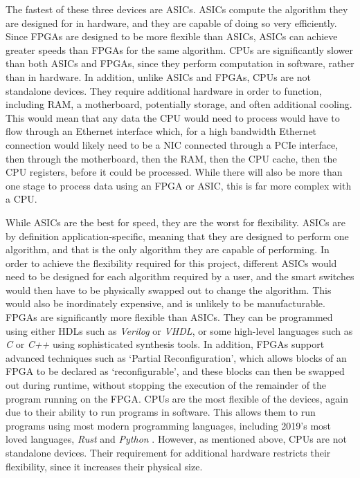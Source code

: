 The fastest of these three devices are ASICs. ASICs compute the algorithm they are designed for in hardware, and they are capable of doing so very efficiently.
Since FPGAs are designed to be more flexible than ASICs, ASICs can achieve greater speeds than FPGAs for the same algorithm.
CPUs are significantly slower than both ASICs and FPGAs, since they perform computation in software, rather than in hardware. In addition, unlike ASICs and FPGAs, CPUs are not standalone devices. They require additional hardware in order to function, including RAM, a motherboard, potentially storage, and often additional cooling. This would mean that any data the CPU would need to process would have to flow through an Ethernet interface which, for a high bandwidth Ethernet connection would likely need to be a NIC connected through a PCIe interface, then through the motherboard, then the RAM, then the CPU cache, then the CPU registers, before it could be processed. While there will also be more than one stage to process data using an FPGA or ASIC, this is far more complex with a CPU.

While ASICs are the best for speed, they are the worst for flexibility. ASICs are by definition application-specific, meaning that they are designed to perform one algorithm, and that is the only algorithm they are capable of performing. In order to achieve the flexibility required for this project, different ASICs would need to be designed for each algorithm required by a user, and the smart switches would then have to be physically swapped out to change the algorithm. This would also be inordinately expensive, and is unlikely to be manufacturable.
FPGAs are significantly more flexible than ASICs. They can be programmed using either HDLs such as \textit{Verilog} or \textit{VHDL}, or some high-level languages such as \textit{C} or \textit{C++} using sophisticated synthesis tools. In addition, FPGAs support advanced techniques such as `Partial Reconfiguration', which allows blocks of an FPGA to be declared as `reconfigurable', and these blocks can then be swapped out during runtime, without stopping the execution of the remainder of the program running on the FPGA.
CPUs are the most flexible of the devices, again due to their ability to run programs in software. This allows them to run programs using most modern programming languages, including 2019's most loved languages, \textit{Rust} and \textit{Python} \cite{stack_overflow_dev_survey_2019}.
However, as mentioned above, CPUs are not standalone devices. Their requirement for additional hardware restricts their flexibility, since it increases their physical size.

